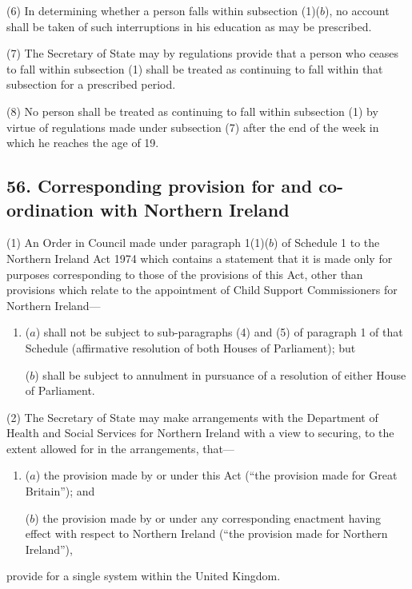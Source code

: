 \documentclass[12pt,a4paper]{article}
\begin{document}
(6) In determining whether a person falls within subsection (1)($b$), no account shall be taken of such interruptions in his education as may be prescribed.

(7) The Secretary of State may by regulations provide that a person who ceases to fall within subsection (1)  shall be treated as continuing to fall within that subsection for a prescribed period.

(8) No person shall be treated as continuing to fall within subsection (1)  by virtue of regulations made under subsection (7)  after the end of the week in which he reaches the age of 19.


\subsection{56. Corresponding provision for and co-ordination with Northern Ireland}

(1) An Order in Council made under paragraph 1(1)($b$)  of Schedule 1 to the Northern Ireland Act 1974 which contains a statement that it is made only for purposes corresponding to those of the provisions of this Act, other than provisions which relate to the appointment of Child Support Commissioners for Northern Ireland—
\begin{enumerate}\item[]
($a$) shall not be subject to sub-paragraphs (4)  and (5)  of paragraph 1 of that Schedule (affirmative resolution of both Houses of Parliament); but

($b$) shall be subject to annulment in pursuance of a resolution of either House of Parliament.
\end{enumerate}

(2) The Secretary of State may make arrangements with the Department of Health and Social Services for Northern Ireland with a view to securing, to the extent allowed for in the arrangements, that—
\begin{enumerate}\item[]
($a$) the provision made by or under this Act (“the provision made for Great Britain”); and

($b$) the provision made by or under any corresponding enactment having effect with respect to Northern Ireland (“the provision made for Northern Ireland”),
\end{enumerate}
provide for a single system within the United Kingdom.
\end{document}
